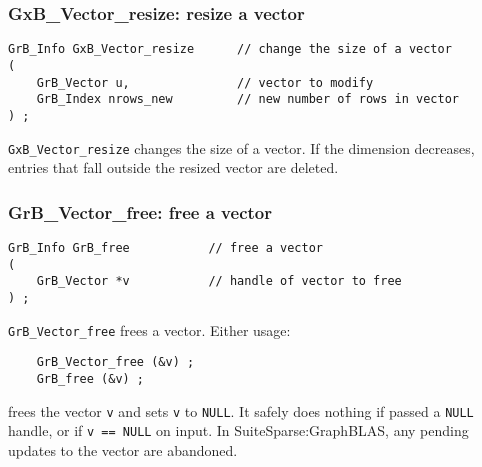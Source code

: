 \documentclass[12pt]{article}
\begin{document}
\newpage
\subsubsection{{\sf GxB\_Vector\_resize:}          resize a vector}
\label{vector_resize}

\begin{mdframed}[userdefinedwidth=6in]
{\footnotesize
\begin{verbatim}
GrB_Info GxB_Vector_resize      // change the size of a vector
(
    GrB_Vector u,               // vector to modify
    GrB_Index nrows_new         // new number of rows in vector
) ;
\end{verbatim} } \end{mdframed}

\verb'GxB_Vector_resize' changes the size of a vector.  If the dimension
decreases, entries that fall outside the resized vector are deleted.

\subsubsection{{\sf GrB\_Vector\_free:}          free a vector}
\label{vector_free}

\begin{mdframed}[userdefinedwidth=6in]
{\footnotesize
\begin{verbatim}
GrB_Info GrB_free           // free a vector
(
    GrB_Vector *v           // handle of vector to free
) ;
\end{verbatim}
} \end{mdframed}

\verb'GrB_Vector_free' frees a vector.  Either usage:

    {\small
    \begin{verbatim}
    GrB_Vector_free (&v) ;
    GrB_free (&v) ; \end{verbatim}}

\noindent
frees the vector \verb'v' and sets \verb'v' to \verb'NULL'.  It safely does
nothing if passed a \verb'NULL' handle, or if \verb'v == NULL' on input.
In SuiteSparse:GraphBLAS, any pending updates to the vector are abandoned.

\newpage
\end{document}
